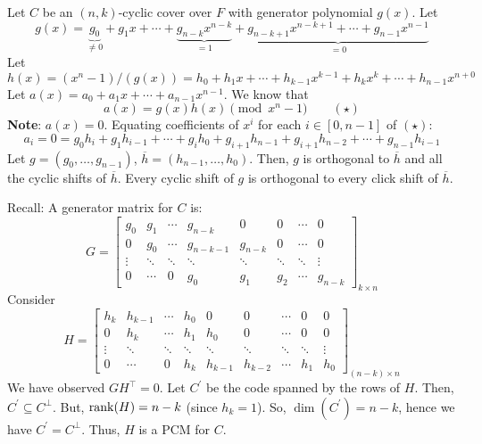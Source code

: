 Let $ C $ be an $ (n,k) $-cyclic cover over $ F $ with generator
polynomial $ g(x) $. Let
\[ g(x)=\underbrace{g_0}_{\neq 0}+g_1x+\cdots+\underbrace{g_{n-k}x^{n-k}}_{=1}+
    \underbrace{g_{n-k+1}x^{n-k+1}+\cdots+g_{n-1}x^{n-1}}_{=0} \]
Let
\[ h(x)=(x^n-1)/(g(x))=h_0+h_1x+\cdots+h_{k-1}x^{k-1}+h_k x^k+\cdots+h_{n-1}x^{n+0} \]
Let $ a(x)=a_0+a_1x+\cdots+a_{n-1}x^{n-1} $. We know that
\[ a(x)=g(x)h(x)\pmod{x^n-1} \qquad (\star) \]
\textbf{Note}: $ a(x)=0 $. Equating coefficients of $ x^i $ for each $ i\in [0,n-1] $
of $ (\star) $:
\[ a_i=0=g_0h_i+g_1h_{i-1}+\cdots+g_i h_0+g_{i+1}h_{n-1}
    +g_{i+1}h_{n-2}+\cdots+g_{n-1}h_{i-1} \]
Let $ g=(g_0,\ldots ,g_{n-1}) $, $ \overline{h}=(h_{n-1},\ldots ,h_0) $.
Then, $ g $ is orthogonal to $ \overline{h} $ and all the cyclic shifts
of $ \overline{h} $. Every cyclic shift of $ g $ is orthogonal to
every click shift of $ \overline{h} $.

Recall: A generator matrix for $ C $ is:
\[ G=
    \left[
        \begin{array}{cccccccc}
            g_{0}  & g_{1}  & \cdots & g_{n-k}   & 0       & 0      & \cdots & 0       \\
            0      & g_{0}  & \cdots & g_{n-k-1} & g_{n-k} & 0      & \cdots & 0       \\
            \vdots & \ddots & \ddots & \ddots    & \ddots  & \ddots & \ddots & \vdots  \\
            0      & \cdots & 0      & g_{0}     & g_{1}   & g_{2}  & \cdots & g_{n-k}
        \end{array}
        \right]_{k \times{} n} \]
Consider
\[ H=
    \left[
        \begin{array}{ccccccccc}
            h_{k}  & h_{k-1} & \cdots & h_{0}  & 0       & 0       & \cdots & 0      & 0      \\
            0      & h_{k}   & \cdots & h_{1}  & h_{0}   & 0       & \cdots & 0      & 0      \\
            \vdots & \ddots  & \ddots & \ddots & \ddots  & \ddots  & \ddots & \ddots & \vdots \\
            0      & \cdots  & 0      & h_{k}  & h_{k-1} & h_{k-2} & \cdots & h_{1}  & h_{0}
        \end{array}
        \right]_{(n-k) \times{} n} \]
We have observed $ GH^{\top}=0 $. Let $ C^{\prime} $ be the code
spanned by the rows of $ H $. Then, $ C^{\prime}\subseteq C^{\perp} $.
But, $ \operatorname{rank}(H)=n-k $ (since $ h_k=1 $). So, $ \dim(C^\prime)=n-k $,
hence we have $ C^\prime=C^{\perp} $. Thus, $ H $ is a PCM for $ C $.

